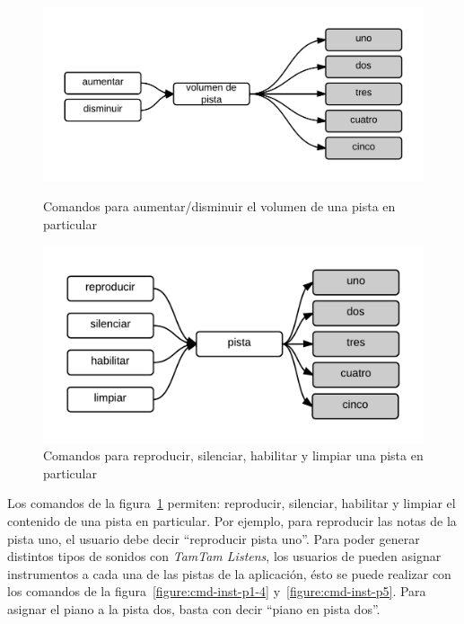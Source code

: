 \begin{figure}[H] 
\begin{minipage}[b]{0.5\linewidth}
\centering
\includegraphics[width=0.8\linewidth]{./graphics/vol-pista.png}
\caption{Comandos para aumentar/disminuir el volumen de una pista en particular}
\label{figure:cmd-vol-pista}
\end{minipage}
\quad
\begin{minipage}[b]{0.5\linewidth}
\centering
\includegraphics[width=0.9\linewidth]{./graphics/rep-pista.png}
\caption{Comandos para reproducir, silenciar, habilitar y limpiar una pista en particular}
\label{figure:cmd-rep-pista}
\end{minipage}
\end{figure}

Los comandos de la figura~\ref{figure:cmd-rep-pista} permiten: reproducir, silenciar, habilitar y limpiar el contenido de una
pista en particular. Por ejemplo, para reproducir las notas de la pista uno, el usuario debe decir ``reproducir pista uno''. 
Para poder generar distintos tipos de sonidos con \emph{TamTam Listens}, los usuarios de pueden asignar
instrumentos a cada una de las pistas de
la aplicaci\'on, \'esto se puede realizar con los comandos de la figura~\ref{figure:cmd-inst-p1-4} y~\ref{figure:cmd-inst-p5}. Para
asignar el piano a la pista dos, basta con decir ``piano en pista dos''.


